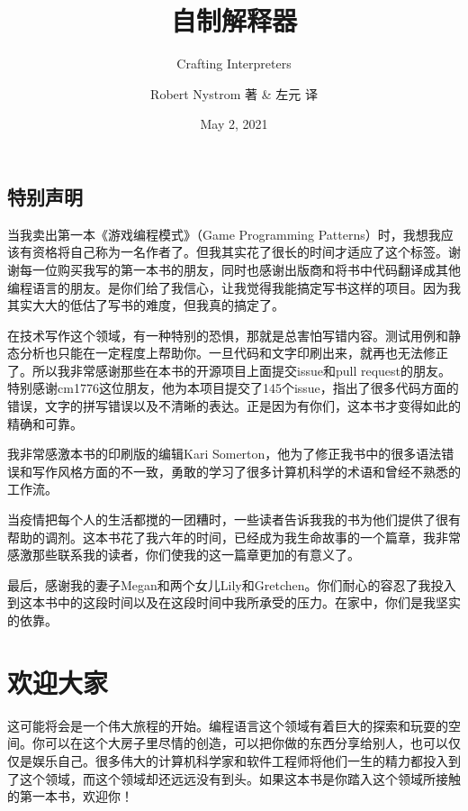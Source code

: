 \documentclass[cn,10pt,math=newtx,citestyle=gb7714-2015,bibstyle=gb7714-2015]{elegantbook}
\title{自制解释器}
\subtitle{Crafting Interpreters}
\author{Robert Nystrom 著 \& 左元 译}
\institute{Elegant\LaTeX{} Program}
\date{May 2, 2021}
\begin{document}
\maketitle
\frontmatter

\chapter*{特别声明}


当我卖出第一本《游戏编程模式》（Game Programming Patterns）时，我想我应该有资格将自己称为一名作者了。但我其实花了很长的时间才适应了这个标签。谢谢每一位购买我写的第一本书的朋友，同时也感谢出版商和将书中代码翻译成其他编程语言的朋友。是你们给了我信心，让我觉得我能搞定写书这样的项目。因为我其实大大的低估了写书的难度，但我真的搞定了。

在技术写作这个领域，有一种特别的恐惧，那就是总害怕写错内容。测试用例和静态分析也只能在一定程度上帮助你。一旦代码和文字印刷出来，就再也无法修正了。所以我非常感谢那些在本书的开源项目上面提交issue和pull request的朋友。特别感谢cm1776这位朋友，他为本项目提交了145个issue，指出了很多代码方面的错误，文字的拼写错误以及不清晰的表达。正是因为有你们，这本书才变得如此的精确和可靠。

我非常感激本书的印刷版的编辑Kari Somerton，他为了修正我书中的很多语法错误和写作风格方面的不一致，勇敢的学习了很多计算机科学的术语和曾经不熟悉的工作流。

当疫情把每个人的生活都搅的一团糟时，一些读者告诉我我的书为他们提供了很有帮助的调剂。这本书花了我六年的时间，已经成为我生命故事的一个篇章，我非常感激那些联系我的读者，你们使我的这一篇章更加的有意义了。

最后，感谢我的妻子Megan和两个女儿Lily和Gretchen。你们耐心的容忍了我投入到这本书中的这段时间以及在这段时间中我所承受的压力。在家中，你们是我坚实的依靠。

\tableofcontents

\mainmatter

\part{欢迎大家}

这可能将会是一个伟大旅程的开始。编程语言这个领域有着巨大的探索和玩耍的空间。你可以在这个大房子里尽情的创造，可以把你做的东西分享给别人，也可以仅仅是娱乐自己。很多伟大的计算机科学家和软件工程师将他们一生的精力都投入到了这个领域，而这个领域却还远远没有到头。如果这本书是你踏入这个领域所接触的第一本书，欢迎你！
\end{document}
